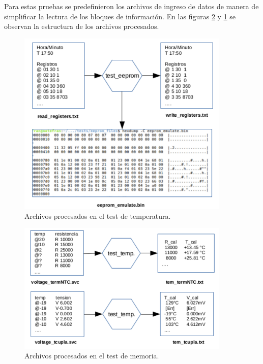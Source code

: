 Para estas pruebas se predefinieron los archivos de ingreso de datos de manera de simplificar la lectura de los bloques de información. En las figuras \ref{fig:files_test_mem} y \ref{fig:files_test_temp} se observan la estructura de los archivos procesados.

\begin{figure}[h!]
	\centering
	\includegraphics[width=0.9\textwidth]{Figures/Cap_4/files_test_temperatura}
	\caption{ Archivos procesados en el test de temperatura.}
	\label{fig:files_test_temp}
\end{figure}

\begin{figure}[h!]
	\centering
	\includegraphics[width=0.9\textwidth]{Figures/Cap_4/files_test_memoria}
	\caption{Archivos procesados en el test de memoria.}
	\label{fig:files_test_mem}
\end{figure}


